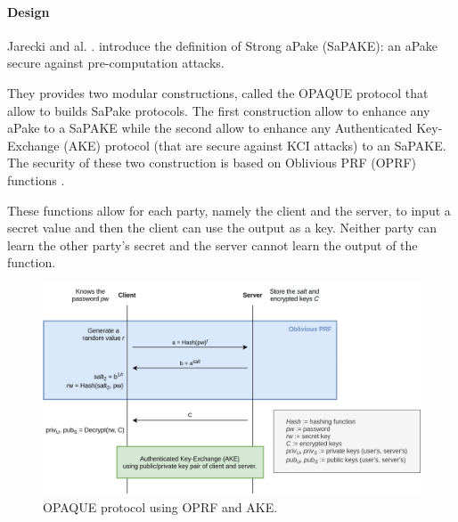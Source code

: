 \documentclass[../report.tex]{subfiles}
\begin{document}




\paragraph{Design}
Jarecki and al. \cite{}. introduce the definition of Strong aPake (SaPAKE): an aPake secure against pre-computation attacks.

They provides two modular constructions, called the OPAQUE protocol that allow to builds SaPake protocols. The first construction allow to enhance any aPake to a SaPAKE while the second allow to enhance any Authenticated Key-Exchange (AKE) protocol (that are secure against KCI attacks) to an SaPAKE.
The security of these two construction is based on Oblivious PRF (OPRF) functions \cite{}.

These functions allow for each party, namely the client and the server, to input a secret value and then the client can use the output as a key. Neither party can learn the other party's secret and the server cannot learn the output of the function.


\begin{figure}[h]
 \centering
 \includegraphics[width=\textwidth]{OPAQUE.png}
 \caption{OPAQUE protocol using OPRF and AKE.}
 \label{fig:OPAQUE_AKE}
\end{figure}
\end{document}
